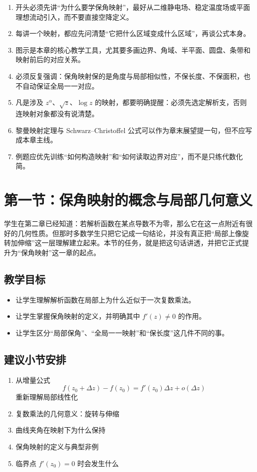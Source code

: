 \begin{tishi}[写作总原则]
\begin{enumerate}
    \item 开头必须先讲``为什么要学保角映射''，最好从二维静电场、稳定温度场或平面理想流动引入，而不要直接空降定义。
    \item 每讲一个映射，都应先问清楚``它把什么区域变成什么区域''，再谈公式本身。
    \item 图示是本章的核心教学工具，尤其要多画边界、角域、半平面、圆盘、条带和映射前后的对应关系。
    \item 必须反复强调：保角映射保的是角度与局部相似性，不保长度、不保面积，也不自动保证全局一一对应。
    \item 凡是涉及 $z^\alpha$、$\sqrt{z}$、$\log z$ 的映射，都要明确提醒：必须先选定解析支，否则连映射对象都没有说清楚。
    \item 黎曼映射定理与 Schwarz--Christoffel 公式可以作为章末展望提一句，但不应写成本章主线。
    \item 例题应优先训练``如何构造映射''和``如何读取边界对应''，而不是只练代数化简。
\end{enumerate}
\end{tishi}

\section{第一节：保角映射的概念与局部几何意义}

\begin{wulibj}[本节要解决的问题]
学生在第二章已经知道：若解析函数在某点导数不为零，那么它在这一点附近有很好的几何性质。但那时多数学生只把它记成一句结论，并没有真正把``局部上像旋转加伸缩''这一层理解建立起来。本节的任务，就是把这句话讲透，并把它正式提升为``保角映射''这一章的起点。
\end{wulibj}

\subsection*{教学目标}
\begin{itemize}
    \item 让学生理解解析函数在局部上为什么近似于一次复数乘法。
    \item 让学生掌握保角映射的定义，并明确其中 $f'(z)\neq 0$ 的作用。
    \item 让学生区分``局部保角''、``全局一一映射''和``保长度''这几件不同的事。
\end{itemize}

\subsection*{建议小节安排}
\begin{enumerate}
    \item 从增量公式
    \[
        f(z_0+\Delta z)-f(z_0)=f'(z_0)\Delta z+o(\Delta z)
    \]
    重新理解局部线性化
    \item 复数乘法的几何意义：旋转与伸缩
    \item 曲线夹角在映射下为什么保持
    \item 保角映射的定义与典型非例
    \item 临界点 $f'(z_0)=0$ 时会发生什么
\end{enumerate}

